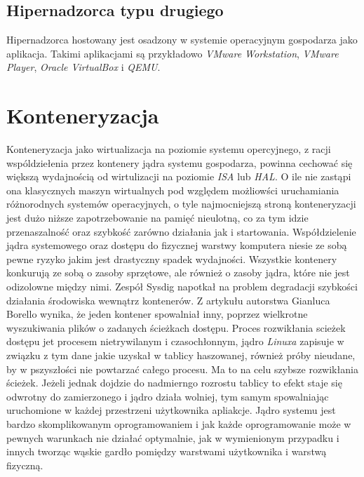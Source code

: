 \documentclass[polish, a4paper, 12pt, oneside]{book}
\begin{document}
\subsection {Hipernadzorca typu drugiego} 
Hipernadzorca hostowany jest osadzony w systemie operacyjnym gospodarza jako aplikacja. Takimi aplikacjami są przykładowo \textit{VMware Workstation}\cite{vmwareworkstation}, \textit{VMware Player}\cite{vmwareplayer}, \textit{Oracle VirtualBox}\cite{virtualbox} i \textit{QEMU}\cite{qemu}.

\section{Konteneryzacja}
Konteneryzacja jako wirtualizacja na poziomie systemu opercyjnego, z racji wspóldziełenia przez kontenery jądra systemu gospodarza, powinna cechować się większą wydajnością od wirtulizacji na poziomie \textit{ISA} lub \textit{HAL}. O ile nie zastąpi ona klasycznych maszyn wirtualnych pod względem możliowści uruchamiania różnorodnych systemów operacyjnych, o tyle najmocniejszą stroną konteneryzacji jest dużo niższe zapotrzebowanie na pamięć nieulotną, co za tym idzie przenaszalność oraz szybkość zarówno działania jak i startowania. Współdzielenie jądra systemowego oraz dostępu do fizycznej warstwy komputera niesie ze sobą pewne ryzyko jakim jest drastyczny spadek wydajności. Wszystkie kontenery konkurują ze sobą o zasoby sprzętowe, ale również o zasoby jądra, które nie jest odizolowne między nimi. Zespół Sysdig napotkał na problem degradacji szybkości działania środowiska wewnątrz kontenerów. Z artykułu autorstwa Gianluca Borello\cite{sd17} wynika, że jeden kontener spowalniał inny, poprzez wielkrotne wyszukiwania plików o zadanych ścieżkach dostępu. Proces rozwikłania scieżek dostępu jet procesem nietrywilanym i czasochłonnym, jądro \textit{Linuxa} zapisuje w związku z tym dane jakie uzyskał w tablicy haszowanej, również próby nieudane, by w pszyszłości nie powtarzać całego procesu. Ma to na celu szybsze rozwikłania ścieżek. Jeżeli jednak dojdzie do nadmierngo rozrostu tablicy to efekt staje się odwrotny do zamierzonego i jądro działa wolniej, tym samym spowalniając uruchomione w każdej przestrzeni użytkownika apliakcje. Jądro systemu jest bardzo skomplikowanym oprogramowaniem i jak każde oprogramowanie może w pewnych warunkach nie działać optymalnie, jak w wymienionym przypadku i innych tworząc wąskie gardło pomiędzy warstwami użytkownika i warstwą fizyczną.
\end{document}
